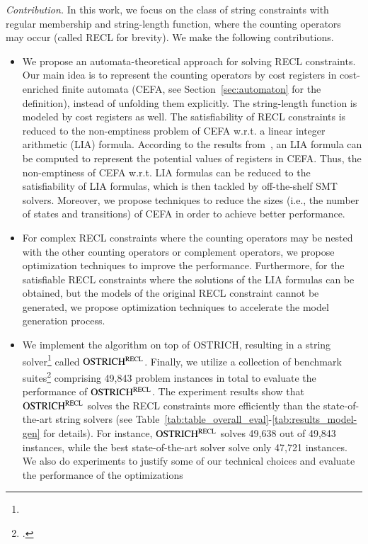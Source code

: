 \medskip
\noindent 
\emph{Contribution.} In this work, we focus on the class of string constraints with regular membership and string-length function, where the counting operators may occur (called RECL for brevity). We make the following contributions.
\begin{itemize}
  \item We propose an automata-theoretical approach for solving RECL constraints.
 Our main idea is to represent the counting operators by cost registers in cost-enriched finite automata (CEFA, see Section~\ref{sec:automaton} for the definition), instead of unfolding them explicitly. The string-length function is modeled by cost registers as well. The satisfiability of RECL constraints is reduced to the non-emptiness problem of CEFA w.r.t. a linear integer arithmetic (LIA) formula. According to the results from~\cite{atva2020}, an LIA formula can be computed to represent the potential values of registers in CEFA.
Thus, the non-emptiness of CEFA w.r.t. LIA formulas can be reduced to the satisfiability of LIA formulas, which is then tackled by off-the-shelf SMT solvers. Moreover, we propose techniques to reduce the sizes (i.e., the number of states and transitions) of CEFA in order to achieve better performance.
%
  \item For complex RECL constraints where the counting operators may be nested with the other counting operators or complement operators, we propose optimization techniques to improve the performance. Furthermore, for the satisfiable RECL constraints where the solutions of the LIA formulas can be obtained, but the models of the original RECL constraint cannot be generated,  we propose optimization techniques to accelerate the model generation process. 
%
\item We implement the algorithm on top of OSTRICH, resulting in a string solver\footnote{} called $\rm OSTRICH^{RECL}$. Finally, we utilize a collection of benchmark suites\footnote{.} comprising 49,843 problem instances in total to evaluate the performance of $\rm OSTRICH^{RECL}$. The experiment results show that $\rm OSTRICH^{RECL}$ solves the RECL constraints more efficiently than the state-of-the-art string solvers (see Table~\ref{tab:table_overall_eval}-\ref{tab:results_model-gen} for details). For instance, $\rm OSTRICH^{RECL}$ solves 49,638 out of 49,843 instances, while the best state-of-the-art solver solve only 47,721 instances. We also do experiments to justify some of our technical choices and evaluate the performance of the optimizations


\end{itemize}
